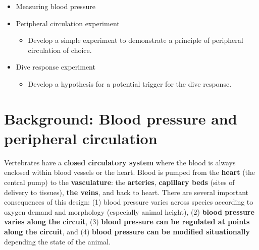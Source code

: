 \documentclass[
  letterpaper,
  DIV=11,
  numbers=noendperiod,
  oneside]{scrartcl}
\providecommand{\tightlist}{%
  \setlength{\itemsep}{0pt}\setlength{\parskip}{0pt}}\usepackage{longtable,booktabs,array}
\begin{document}
\begin{tcolorbox}[enhanced jigsaw, opacityback=0, colbacktitle=quarto-callout-note-color!10!white, opacitybacktitle=0.6, colback=white, leftrule=.75mm, title=\textcolor{quarto-callout-note-color}{\faInfo}\hspace{0.5em}{Exercises}, breakable, rightrule=.15mm, colframe=quarto-callout-note-color-frame, bottomrule=.15mm, bottomtitle=1mm, arc=.35mm, toptitle=1mm, titlerule=0mm, toprule=.15mm, left=2mm, coltitle=black]

\begin{itemize}
\tightlist
\item
  Measuring blood pressure
\item
  Peripheral circulation experiment

  \begin{itemize}
  \tightlist
  \item
    Develop a simple experiment to demonstrate a principle of peripheral
    circulation of choice.
  \end{itemize}
\item
  Dive response experiment

  \begin{itemize}
  \tightlist
  \item
    Develop a hypothesis for a potential trigger for the dive response.
  \end{itemize}
\end{itemize}

\end{tcolorbox}

\hypertarget{background-blood-pressure-and-peripheral-circulation}{%
\section{Background: Blood pressure and peripheral
circulation}\label{background-blood-pressure-and-peripheral-circulation}}

Vertebrates have a \textbf{closed circulatory system} where the blood is
always enclosed within blood vessels or the heart. Blood is pumped from
the \textbf{heart} (the central pump) to the \textbf{vasculature}: the
\textbf{arteries}, \textbf{capillary beds} (sites of delivery to
tissues), \textbf{the veins}, and back to heart. There are several
important consequences of this design: (1) blood pressure varies across
species according to oxygen demand and morphology (especially animal
height), (2) \textbf{blood pressure varies along the circuit}, (3)
\textbf{blood pressure can be regulated at points along the circuit},
and (4) \textbf{blood pressure can be modified situationally} depending
the state of the animal.
\end{document}
